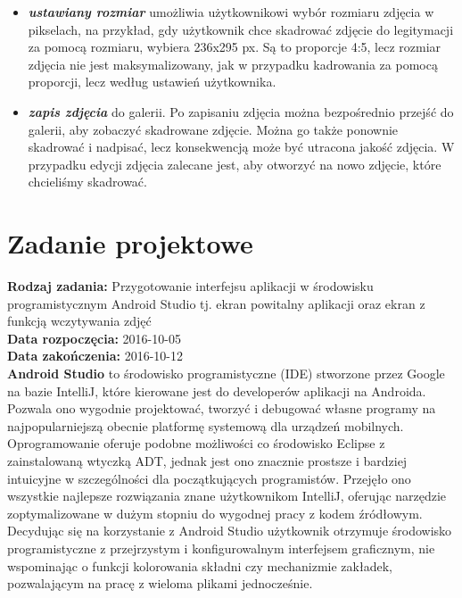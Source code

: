 \begin{itemize}
\begin{itemize}
\item \textit{\textbf{ustawiany rozmiar}} umożliwia użytkownikowi wybór rozmiaru zdjęcia w pikselach, na przykład, gdy użytkownik chce skadrować zdjęcie do legitymacji za pomocą rozmiaru, wybiera 236x295 px. Są to proporcje 4:5, lecz rozmiar zdjęcia nie jest maksymalizowany, jak w przypadku kadrowania za pomocą proporcji, lecz według ustawień użytkownika.
\item \textit{\textbf{zapis zdjęcia}} do galerii. Po zapisaniu zdjęcia można bezpośrednio przejść do galerii, aby zobaczyć skadrowane zdjęcie. Można go także ponownie skadrować i nadpisać, lecz konsekwencją może być utracona jakość zdjęcia. W przypadku edycji zdjęcia zalecane jest, aby otworzyć na nowo zdjęcie, które chcieliśmy skadrować. 
\end{itemize}
\end{itemize}

\section{Zadanie projektowe}
\noindent\textbf{Rodzaj zadania:} Przygotowanie interfejsu aplikacji w środowisku programistycznym Android Studio tj. ekran powitalny aplikacji oraz ekran z funkcją wczytywania zdjęć\\

\noindent\textbf{Data rozpoczęcia:} 2016-10-05\\

\noindent\textbf{Data zakończenia:} 2016-10-12\\

\textbf{Android Studio}  to środowisko programistyczne (IDE) stworzone przez Google na bazie IntelliJ, które kierowane jest do developerów aplikacji na Androida. Pozwala ono wygodnie projektować, tworzyć i debugować własne programy na najpopularniejszą obecnie platformę systemową dla urządzeń mobilnych. Oprogramowanie oferuje podobne możliwości co środowisko Eclipse z zainstalowaną wtyczką ADT, jednak jest ono znacznie prostsze i bardziej intuicyjne w szczególności dla początkujących programistów. Przejęło ono wszystkie najlepsze rozwiązania znane użytkownikom IntelliJ, oferując narzędzie zoptymalizowane w dużym stopniu do wygodnej pracy z kodem źródłowym. Decydując się na korzystanie z Android Studio użytkownik otrzymuje środowisko programistyczne z przejrzystym i konfigurowalnym interfejsem graficznym, nie wspominając o funkcji kolorowania składni czy mechanizmie zakładek, pozwalającym na pracę z wieloma plikami jednocześnie.\\


